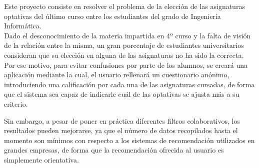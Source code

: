 \newcommand{\grad}{$^{\circ}$}
\nonzeroparskip
Este proyecto consiste en resolver el problema de la elección de las asignaturas optativas del último curso entre los estudiantes del grado de Ingeniería Informática. \\

Dado el desconocimiento de la materia impartida en 4º curso y la falta de visión de la relación entre la misma, un gran porcentaje de estudiantes universitarios consideran que su elección en alguna de las asignaturas no ha sido la correcta. \\

Por ese motivo, para evitar confusiones por parte de los alumnos, se creará una aplicación mediante la cual, el usuario rellenará un  cuestionario anónimo, introduciendo  una calificación por cada una de las asignaturas cursadas, de forma que el sistema sea capaz de indicarle cuál de las optativas se ajusta más a su criterio. 

Sin embargo, a pesar de poner en práctica diferentes filtros colaborativos, los resultados pueden mejorarse, ya que el número de datos recopilados hasta el momento son mínimos con respecto a los sistemas de recomendación utilizados en grandes empresas, de forma que la recomendación ofrecida al usuario es simplemente orientativa. 